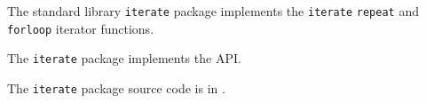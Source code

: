 
The standard library {\tt iterate} package implements the {\tt iterate} {\tt repeat} and {\tt forloop} iterator functions.

The {\tt iterate} package implements the  API.

The {\tt iterate} package source code is in .
